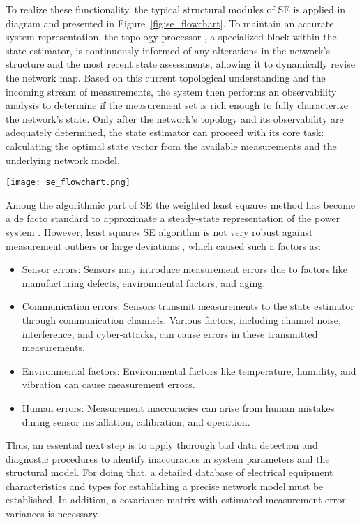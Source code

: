 To realize these functionality, the typical structural modules of SE is applied in diagram and presented in Figure~\cref{fig:se_flowchart}. To maintain an accurate system representation, the topology-processor \autocite{32475}, a specialized block within the state estimator, is continuously informed of any alterations in the network's structure and the most recent state assessments, allowing it to dynamically revise the network map. Based on this current topological understanding and the incoming stream of measurements, the system then performs an observability analysis to determine if the measurement set is rich enough to fully characterize the network's state. Only after the network's topology and its observability are adequately determined, the state estimator can proceed with its core task: calculating the optimal state vector from the available measurements and the underlying network model. 

\begin{figure*}[htbp]
    \centering
    \texttt{[image: se\_flowchart.png]}
    \caption{State Estimation functional modules.}
    \label{fig:se_flowchart}
\end{figure*}

Among the algorithmic part of SE the weighted least squares method has become a de facto standard to approximate a steady-state representation of the power system \autocite{abur2004power}. However, least squares SE algorithm is not very robust against  measurement outliers or large deviations \autocite{WU199080}, which caused such a factors as:
\begin{itemize}
    \item Sensor errors: Sensors may introduce measurement errors due to factors like manufacturing defects, environmental factors, and aging.
    \item Communication errors: Sensors transmit measurements to the state estimator through communication channels. Various factors, including channel noise, interference, and cyber-attacks, can cause errors in these transmitted measurements.
    \item Environmental factors: Environmental factors like temperature, humidity, and vibration can cause measurement errors.
    \item Human errors: Measurement inaccuracies can arise from human mistakes during sensor installation, calibration, and operation.
\end{itemize}

Thus, an essential next step is to apply thorough bad data detection and diagnostic procedures to identify inaccuracies in system parameters and the structural model. For doing that, a detailed database of electrical equipment characteristics and types for establishing a precise network model must be established. In addition, a covariance matrix with estimated measurement error variances is necessary.


